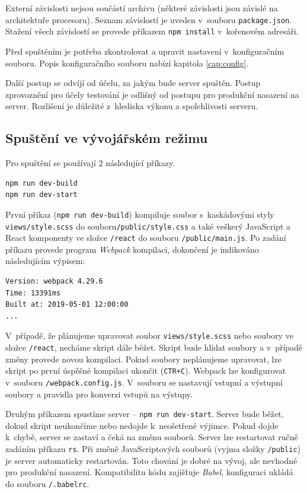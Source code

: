 Externí závislosti nejsou součástí archivu (některé závislosti jsou závislé na architektuře procesoru). Seznam závislostí je uveden v~souboru \texttt{package.json}. Stažení všech závislostí se provede příkazem \texttt{npm install} v~kořenovém adresáři.

Před spuštěním je potřeba zkontrolovat a upravit nastavení v~konfiguračním souboru. Popis konfiguračního souboru nabízí kapitola \ref{cap:config}.

Další postup se odvíjí od účelu, za jakým bude server spuštěn. Postup zprovoznění pro účely testování je odlišný od postupu pro produkční nasazení na server. Rozlišení je důležité z~hlediska výkonu a spolehlivosti serveru.

\subsection{Spuštění ve vývojářském režimu}
Pro spuštění se používají 2 následující příkazy.
\begin{lstlisting}[style=bash]
npm run dev-build
npm run dev-start
\end{lstlisting}
První příkaz (\texttt{npm run dev-build}) kompiluje soubor s~kaskádovými styly \texttt{views/style.scss} do souboru\texttt{/public/style.css} a také veškerý JavaScript a React komponenty ve složce \texttt{/react} do souboru \texttt{/public/main.js}. Po zadání příkazu provede program \textit{Webpack} kompilaci, dokončení je indikováno následujícím výpisem:
\begin{lstlisting}
Version: webpack 4.29.6
Time: 13391ms
Built at: 2019-05-01 12:00:00
...
\end{lstlisting}

V~případě, že plánujeme upravovat soubor \texttt{views/style.scss} nebo soubory ve složce \texttt{/react}, necháme skript dále běžet. Skript bude hlídat soubory a v~případě změny provede novou kompilaci. Pokud soubory neplánujeme upravovat, lze skript po první úspěšné kompilaci ukončit (\texttt{CTR+C}). Webpack lze konfigurovat v~souboru \texttt{/webpack.config.js}. V~souboru se nastavují vstupní a výstupní soubory a pravidla pro konverzi vstupů na výstupy.

Druhým příkazem spustíme server -- \texttt{npm run dev-start}. Server bude běžet, dokud skript neukončíme nebo nedojde k~neošetřené výjimce. Pokud dojde k~chybě, server se zastaví a čeká na změnu souborů. Server lze restartovat ručně zadáním příkazu \texttt{rs}. Při změně JavaScriptových souborů (vyjma složky \texttt{/public}) je server automaticky restartován. Toto chování je dobré na vývoj, ale nevhodné pro produkční nasazení. Kompatibilitu kódu zajišťuje \textit{Babel}, konfiguraci ukládá do souboru \texttt{/.babelrc}.

